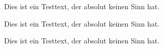 \documentclass[a3paper,13pt,scifiposter]{tubsposter}
\begin{document}
\layout[sender=top,bgcolor,scifiposter]{%
  \showtubslogo
}
\begin{scifibox}
Dies ist ein Testtext, der absolut keinen Sinn hat.
\end{scifibox}
\begin{scifibox}
Dies ist ein Testtext, der absolut keinen Sinn hat.
\end{scifibox}
\begin{scifibox}
Dies ist ein Testtext, der absolut keinen Sinn hat.
\end{scifibox}
~
\newpage
~
\newpage
~
\newpage
\end{document}
